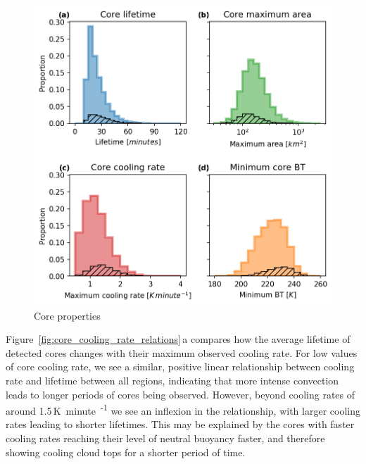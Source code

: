 \begin{figure}[tp]
    \centering
    \includegraphics[width=\textwidth]{figures/ch2_09.png}
    \caption{Core properties}
    \label{fig:core_properties}
\end{figure}

Figure~\ref{fig:core_cooling_rate_relations}\,a compares how the average lifetime of detected cores changes with their maximum observed cooling rate.
For low values of core cooling rate, we see a similar, positive linear relationship between cooling rate and lifetime between all regions, indicating that more intense convection leads to longer periods of cores being observed.
However, beyond cooling rates of around 1.5\,\unit{K minute\textsuperscript{-1}} we see an inflexion in the relationship, with larger cooling rates leading to shorter lifetimes.
This may be explained by the cores with faster cooling rates reaching their level of neutral buoyancy faster, and therefore showing cooling cloud tops for a shorter period of time.

